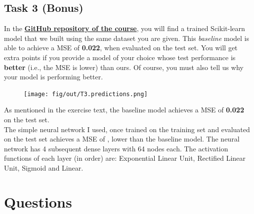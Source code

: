\documentclass[tikz,14pt,fleqn]{article}
\begin{document}
\subsection{Task 3 (Bonus)}

In the \href{https://github.com/GiorgiaAuroraAdorni/ML-bachelor-course-assignments-sp23}{\textbf{GitHub repository of the course}}, you will find a trained Scikit-learn model that we built using the same dataset you are given. 
This \textit{baseline} model is able to achieve a MSE of \textbf{0.022}, when evaluated on the test set. 
You will get extra points if you provide a model of your choice whose test performance is \textbf{better} (i.e., the MSE is lower) than ours. Of course, you must also tell us why your model is performing better.
\begin{figure}
    \centering
    \texttt{[image: fig/out/T3.predictions.png]}
    \vspace{-1.5cm}
    \label{fig:1.1}
\end{figure}
As mentioned in the exercise text, the baseline model achieves a MSE of \textbf{0.022} on the test set. \\ The simple neural network I used, once trained on the training set and evaluated on the test set achieves a MSE of \textbf{}, lower than the baseline model. The neural network has 4 subsequent dense layers with 64 nodes each. The activation functions of each layer (in order) are: Exponential Linear Unit, Rectified Linear Unit, Sigmoid and Linear. \\
\section{Questions}
\end{document}
